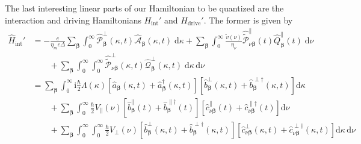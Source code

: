 \documentclass{article}
\begin{document}
The last interesting linear parts of our Hamiltonian to be quantized are the interaction and driving Hamiltonians $H_\mathrm{int}'$ and $H_\mathrm{drive}'$. The former is given by
\begin{equation}
\begin{split}
\hat{H}_\mathrm{int}' &= -\frac{e}{\eta_mc\Delta}\sum_{\bm{\beta}}\int_0^\infty\hat{\mathcal{P}}_{\bm{\beta}}^\perp(\kappa,t)\hat{\mathcal{A}}_{\bm{\beta}}(\kappa,t)\;\mathrm{d}\kappa + \sum_{\bm{\beta}}\int_0^\infty\frac{\tilde{v}(\nu)}{\eta_\nu}\hat{\tilde{\mathcal{P}}}_{\nu\bm{\beta}}^\parallel(t)\hat{Q}_{\bm{\beta}}^\parallel(t)\;\mathrm{d}\nu\\
&\qquad + \sum_{\bm{\beta}}\int_0^\infty\int_0^\infty\hat{\tilde{\mathcal{P}}}_{\nu\bm{\beta}}^\perp(\kappa,t)\hat{\mathcal{Q}}_{\bm{\beta}}^\perp(\kappa,t)\;\mathrm{d}\kappa\,\mathrm{d}\nu\\
&= \sum_{\bm{\beta}}\int_0^\infty\mathrm{i}\frac{\hbar}{2}\Lambda(\kappa)\left[\hat{a}_{\bm{\beta}}(\kappa,t) + \hat{a}_{\bm{\beta}}^\dagger(\kappa,t)\right]\left[\hat{b}_{\bm{\beta}}^\perp(\kappa,t) + \hat{b}_{\bm{\beta}}^{\perp\dagger}(\kappa,t)\right]\mathrm{d}\kappa\\
&\qquad + \sum_{\bm{\beta}}\int_0^\infty\frac{\hbar}{2}V_\parallel(\nu)\left[\hat{b}_{\bm{\beta}}^\parallel(t) + \hat{b}_{\bm{\beta}}^{\parallel\dagger}(t)\right]\left[\hat{c}_{\nu\bm{\beta}}^\parallel(t) + \hat{c}_{\nu\bm{\beta}}^{\parallel\dagger}(t)\right]\mathrm{d}\nu\\
&\qquad +  \sum_{\bm{\beta}}\int_0^\infty\int_0^\infty\frac{\hbar}{2}V_\perp(\nu)\left[\hat{b}_{\bm{\beta}}^\perp(\kappa,t) + \hat{b}_{\bm{\beta}}^{\perp\dagger}(\kappa,t)\right]\left[\hat{c}_{\nu\bm{\beta}}^\perp(\kappa,t) + \hat{c}_{\nu\bm{\beta}}^{\perp\dagger}(\kappa,t)\right]\mathrm{d}\kappa\,\mathrm{d}\nu
\end{split}
\end{equation}
\end{document}

